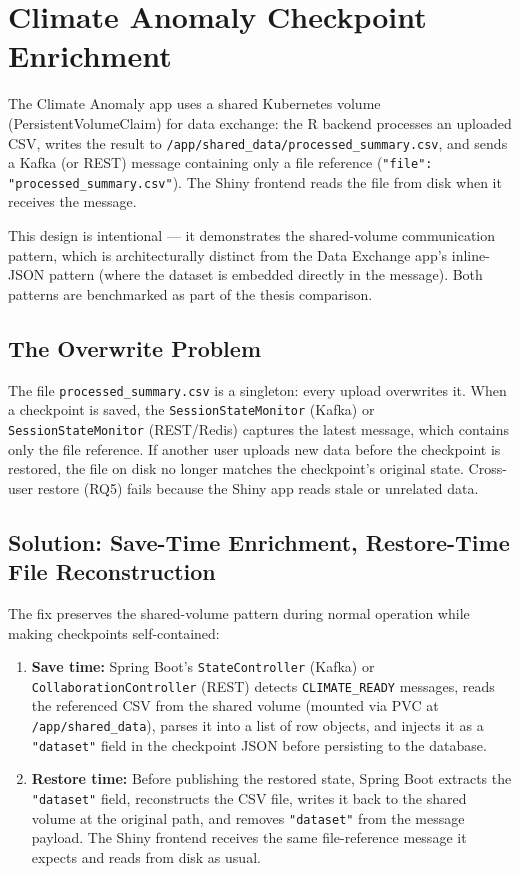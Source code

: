 \documentclass[11pt,a4paper]{article}
\begin{document}
\section{Climate Anomaly Checkpoint Enrichment}

The Climate Anomaly app uses a shared Kubernetes volume (PersistentVolumeClaim)
for data exchange: the R backend processes an uploaded CSV, writes the result to
\texttt{/app/shared\_data/processed\_summary.csv}, and sends a Kafka (or REST)
message containing only a file reference (\texttt{"file": "processed\_summary.csv"}).
The Shiny frontend reads the file from disk when it receives the message.

This design is intentional --- it demonstrates the shared-volume communication
pattern, which is architecturally distinct from the Data Exchange app's
inline-JSON pattern (where the dataset is embedded directly in the message).
Both patterns are benchmarked as part of the thesis comparison.

\subsection{The Overwrite Problem}

The file \texttt{processed\_summary.csv} is a singleton: every upload overwrites
it. When a checkpoint is saved, the \texttt{SessionStateMonitor} (Kafka) or
\texttt{SessionStateMonitor} (REST/Redis) captures the latest message, which
contains only the file reference. If another user uploads new data before the
checkpoint is restored, the file on disk no longer matches the checkpoint's
original state. Cross-user restore (RQ5) fails because the Shiny app reads
stale or unrelated data.

\subsection{Solution: Save-Time Enrichment, Restore-Time File Reconstruction}

The fix preserves the shared-volume pattern during normal operation while making
checkpoints self-contained:

\begin{enumerate}[nosep]
  \item \textbf{Save time:} Spring Boot's \texttt{StateController} (Kafka) or
        \texttt{CollaborationController} (REST) detects \texttt{CLIMATE\_READY}
        messages, reads the referenced CSV from the shared volume (mounted via
        PVC at \texttt{/app/shared\_data}), parses it into a list of row objects,
        and injects it as a \texttt{"dataset"} field in the checkpoint JSON
        before persisting to the database.
  \item \textbf{Restore time:} Before publishing the restored state, Spring Boot
        extracts the \texttt{"dataset"} field, reconstructs the CSV file, writes
        it back to the shared volume at the original path, and removes
        \texttt{"dataset"} from the message payload. The Shiny frontend receives
        the same file-reference message it expects and reads from disk as usual.
\end{enumerate}
\end{document}
